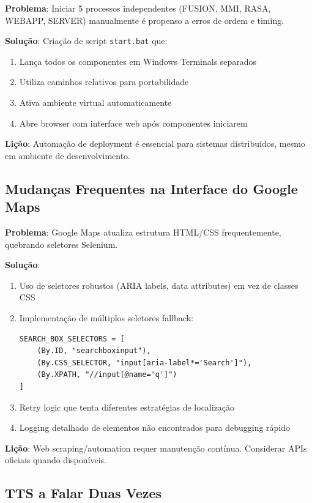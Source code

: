 \documentclass{report}
\begin{document}
\textbf{Problema}: Iniciar 5 processos independentes (FUSION, MMI, RASA, WEBAPP, SERVER) manualmente é propenso a erros de ordem e timing.

\textbf{Solução}: Criação de script \texttt{start.bat} que:
\begin{enumerate}
    \item Lança todos os componentes em Windows Terminals separados
    \item Utiliza caminhos relativos para portabilidade
    \item Ativa ambiente virtual automaticamente
    \item Abre browser com interface web após componentes iniciarem
\end{enumerate}

\textbf{Lição}: Automação de deployment é essencial para sistemas distribuídos, mesmo em ambiente de desenvolvimento.

\subsection{Mudanças Frequentes na Interface do Google Maps}

\textbf{Problema}: Google Maps atualiza estrutura HTML/CSS frequentemente, quebrando seletores Selenium.

\textbf{Solução}:
\begin{enumerate}
    \item Uso de seletores robustos (ARIA labels, data attributes) em vez de classes CSS
    \item Implementação de múltiplos seletores fallback:
    \begin{verbatim}
SEARCH_BOX_SELECTORS = [
    (By.ID, "searchboxinput"),
    (By.CSS_SELECTOR, "input[aria-label*='Search']"),
    (By.XPATH, "//input[@name='q']")
]
    \end{verbatim}
    \item Retry logic que tenta diferentes estratégias de localização
    \item Logging detalhado de elementos não encontrados para debugging rápido
\end{enumerate}

\textbf{Lição}: Web scraping/automation requer manutenção contínua. Considerar APIs oficiais quando disponíveis.

\subsection{TTS a Falar Duas Vezes}
\end{document}

